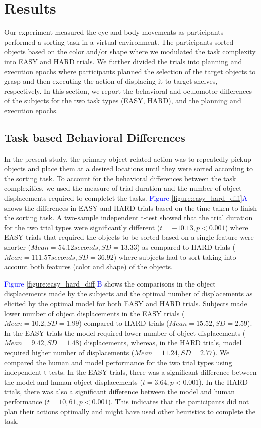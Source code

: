 \section{Results}

Our experiment measured the eye and body movements as participants performed a sorting task in a virtual environment. The participants sorted objects based on the color and/or shape where we modulated the task complexity into EASY and HARD trials. We further divided the trials into planning and execution epochs where participants planned the selection of the target objects to grasp and then executing the action of displacing it to target shelves, respectively. In this section, we report the behavioral and oculomotor differences of the subjects for the two task types (EASY, HARD), and the planning and execution epochs.

\subsection{Task based Behavioral Differences}
In the present study, the primary object related action was to repeatedly pickup objects and place them at a desired locations until they were sorted according to the sorting task. To account for the behavioral differences between the task complexities, we used the measure of trial duration and the number of object displacements required to completet the tasks. \textcolor{Blue}{Figure \ref{figure:easy_hard_diff}A} shows the differences in EASY and HARD trials based on the time taken to finish the sorting task. A two-sample independent t-test showed that the trial duration for the two trial types were significantly different ($t = -10.13, p < 0.001$) where EASY trials that required the objects to be sorted based on a single feature were  shorter ($Mean = 54.12 seconds, SD = 13.33$) as compared to HARD trials ($Mean = 111.57 seconds, SD = 36.92$) where subjects had to sort taking into account both features (color and shape) of the objects. 

\textcolor{Blue}{Figure \ref{figure:easy_hard_diff}B} shows the comparisons in the object displacements made by the subjects and the optimal number of displacements as elicited by the optimal model for both EASY and HARD trials. Subjects made lower number of object displacements in the EASY trials ($ Mean = 10.2, SD = 1.99$) compared to HARD trials ($Mean = 15.52, SD = 2.59$). In the EASY trials the model required lower number of object displacements ($Mean = 9.42, SD = 1.48$) displacements, whereas, in the HARD trials, model required higher number of displacements ($Mean = 11.24, SD = 2.77$). We compared the human and model performance for the two trial types using independent t-tests. In the EASY trials, there was a significant difference between the model and human object displacements ($t=3.64, p<0.001$). In the HARD trials, there was also a significant difference between the model and human performance ($t=10,61, p<0.001$). This indicates that the participants did not plan their actions optimally and might have used other heuristics to complete the task.


